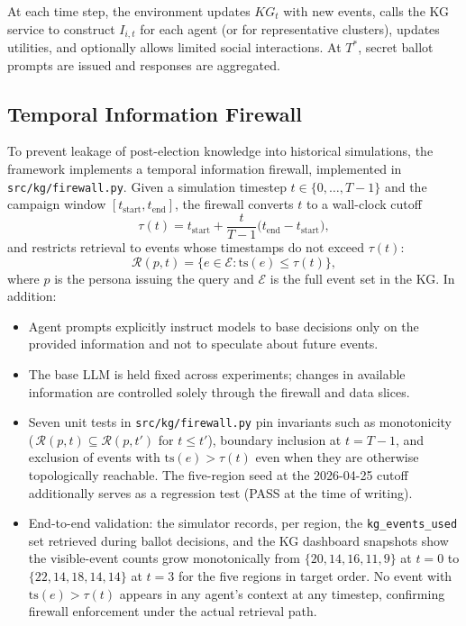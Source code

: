 \documentclass[11pt]{article}
\begin{document}
At each time step, the environment updates $KG_t$ with new events, calls the KG service to construct $I_{i,t}$ for each agent (or for representative clusters), updates utilities, and optionally allows limited social interactions. At $T^*$, secret ballot prompts are issued and responses are aggregated.

\subsection{Temporal Information Firewall}

To prevent leakage of post-election knowledge into historical simulations, the framework implements a temporal information firewall, implemented in \texttt{src/kg/firewall.py}. Given a simulation timestep $t \in \{0, \dots, T-1\}$ and the campaign window $[t_{\text{start}}, t_{\text{end}}]$, the firewall converts $t$ to a wall-clock cutoff
\begin{equation}
\tau(t) = t_{\text{start}} + \frac{t}{T-1}\big(t_{\text{end}} - t_{\text{start}}\big),
\end{equation}
and restricts retrieval to events whose timestamps do not exceed $\tau(t)$:
\begin{equation}
\mathcal{R}(p, t) = \big\{ e \in \mathcal{E} : \mathrm{ts}(e) \le \tau(t) \big\},
\end{equation}
where $p$ is the persona issuing the query and $\mathcal{E}$ is the full event set in the KG. In addition:

\begin{itemize}
  \item Agent prompts explicitly instruct models to base decisions only on the provided information and not to speculate about future events.
  \item The base LLM is held fixed across experiments; changes in available information are controlled solely through the firewall and data slices.
  \item Seven unit tests in \texttt{src/kg/firewall.py} pin invariants such as monotonicity (\,$\mathcal{R}(p,t) \subseteq \mathcal{R}(p,t')$ for $t \le t'$), boundary inclusion at $t=T-1$, and exclusion of events with $\mathrm{ts}(e) > \tau(t)$ even when they are otherwise topologically reachable. The five-region seed at the 2026-04-25 cutoff additionally serves as a regression test (PASS at the time of writing).
  \item End-to-end validation: the simulator records, per region, the \texttt{kg\_events\_used} set retrieved during ballot decisions, and the KG dashboard snapshots show the visible-event counts grow monotonically from $\{20, 14, 16, 11, 9\}$ at $t=0$ to $\{22, 14, 18, 14, 14\}$ at $t=3$ for the five regions in target order. No event with $\mathrm{ts}(e) > \tau(t)$ appears in any agent's context at any timestep, confirming firewall enforcement under the actual retrieval path.
\end{itemize}
\end{document}
